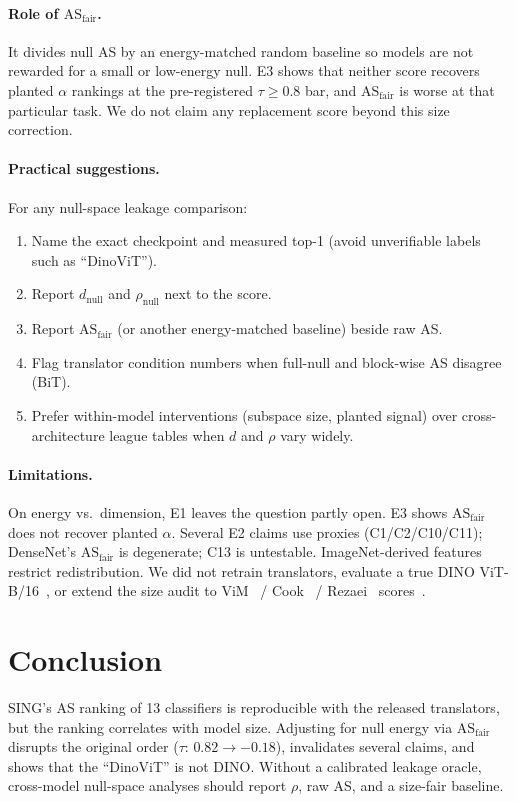 \documentclass[10pt,twocolumn]{article}
\begin{document}
\paragraph{Role of $\mathrm{AS}_{\mathrm{fair}}$.}
It divides null AS by an energy-matched random baseline so models are not rewarded for a small or low-energy null.
E3 shows that neither score recovers planted $\alpha$ rankings at the pre-registered $\tau\ge0.8$ bar, and $\mathrm{AS}_{\mathrm{fair}}$ is worse at that particular task.
We do not claim any replacement score beyond this size correction.

\paragraph{Practical suggestions.}
For any null-space leakage comparison:
\begin{enumerate}
\item Name the exact checkpoint and measured top-1 (avoid unverifiable labels such as ``DinoViT'').
\item Report $d_{\mathrm{null}}$ and $\rho_{\mathrm{null}}$ next to the score.
\item Report $\mathrm{AS}_{\mathrm{fair}}$ (or another energy-matched baseline) beside raw AS.
\item Flag translator condition numbers when full-null and block-wise AS disagree (BiT).
\item Prefer within-model interventions (subspace size, planted signal) over cross-architecture league tables when $d$ and $\rho$ vary widely.
\end{enumerate}

\paragraph{Limitations.}
On energy vs.\ dimension, E1 leaves the question partly open.
E3 shows $\mathrm{AS}_{\mathrm{fair}}$ does not recover planted $\alpha$.
Several E2 claims use proxies (C1/C2/C10/C11); DenseNet's $\mathrm{AS}_{\mathrm{fair}}$ is degenerate; C13 is untestable.
ImageNet-derived features restrict redistribution.
We did not retrain translators, evaluate a true DINO ViT-B/16~\citep{dino2021}, or extend the size audit to ViM~\citep{vim2022} / Cook~\citep{cook2020} / Rezaei~\citep{rezaei2023} scores~\citep{makonnen2025}.

\section{Conclusion}
\vspace{-0.2em}
SING's AS ranking of 13 classifiers is reproducible with the released translators, but the ranking correlates with model size. Adjusting for null energy via $\mathrm{AS}_{\mathrm{fair}}$ disrupts the original order ($\tau{:}\,0.82\to{-}0.18$), invalidates several claims, and shows that the ``DinoViT'' is not DINO.  
Without a calibrated leakage oracle, cross-model null-space analyses should report $\rho$, raw AS, and a size-fair baseline.
\end{document}
